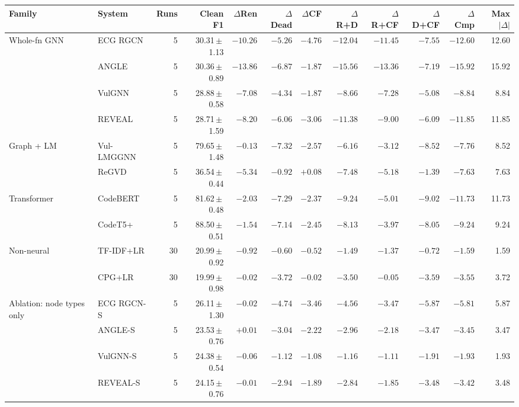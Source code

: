 \begin{tabular}{llrrrrrrrrrr}
\toprule
Family & System & Runs & Clean F1 & $\Delta$Ren & $\Delta$Dead & $\Delta$CF & $\Delta$R+D & $\Delta$R+CF & $\Delta$D+CF & $\Delta$Cmp & Max$|\Delta|$ \\
\midrule
Whole-fn GNN & ECG RGCN & 5 & 30.31\,$\pm$\,1.13 & $\mathbf{-10.26}$ & $\mathbf{-5.26}$ & $\mathbf{-4.76}$ & $\mathbf{-12.04}$ & $\mathbf{-11.45}$ & $\mathbf{-7.55}$ & $\mathbf{-12.60}$ & 12.60 \\
 & ANGLE & 5 & 30.36\,$\pm$\,0.89 & $\mathbf{-13.86}$ & $\mathbf{-6.87}$ & $\mathbf{-1.87}$ & $\mathbf{-15.56}$ & $\mathbf{-13.36}$ & $\mathbf{-7.19}$ & $\mathbf{-15.92}$ & 15.92 \\
 & VulGNN & 5 & 28.88\,$\pm$\,0.58 & $\mathbf{-7.08}$ & $\mathbf{-4.34}$ & $\mathbf{-1.87}$ & $\mathbf{-8.66}$ & $\mathbf{-7.28}$ & $\mathbf{-5.08}$ & $\mathbf{-8.84}$ & 8.84 \\
 & REVEAL & 5 & 28.71\,$\pm$\,1.59 & $\mathbf{-8.20}$ & $\mathbf{-6.06}$ & $\mathbf{-3.06}$ & $\mathbf{-11.38}$ & $\mathbf{-9.00}$ & $\mathbf{-6.09}$ & $\mathbf{-11.85}$ & 11.85 \\
\midrule
Graph + LM & Vul-LMGGNN & 5 & 79.65\,$\pm$\,1.48 & $-0.13$ & $\mathbf{-7.32}$ & $\mathbf{-2.57}$ & $\mathbf{-6.16}$ & $\mathbf{-3.12}$ & $\mathbf{-8.52}$ & $\mathbf{-7.76}$ & 8.52 \\
 & ReGVD & 5 & 36.54\,$\pm$\,0.44 & $\mathbf{-5.34}$ & $-0.92$ & $+0.08$ & $\mathbf{-7.48}$ & $\mathbf{-5.18}$ & $-1.39$ & $\mathbf{-7.63}$ & 7.63 \\
\midrule
Transformer & CodeBERT & 5 & 81.62\,$\pm$\,0.48 & $\mathbf{-2.03}$ & $\mathbf{-7.29}$ & $\mathbf{-2.37}$ & $\mathbf{-9.24}$ & $\mathbf{-5.01}$ & $\mathbf{-9.02}$ & $\mathbf{-11.73}$ & 11.73 \\
 & CodeT5+ & 5 & 88.50\,$\pm$\,0.51 & $\mathbf{-1.54}$ & $\mathbf{-7.14}$ & $\mathbf{-2.45}$ & $\mathbf{-8.13}$ & $\mathbf{-3.97}$ & $\mathbf{-8.05}$ & $\mathbf{-9.24}$ & 9.24 \\
\midrule
Non-neural & TF-IDF+LR & 30 & 20.99\,$\pm$\,0.92 & $-0.92$ & $-0.60$ & $-0.52$ & $-1.49$ & $-1.37$ & $-0.72$ & $-1.59$ & 1.59 \\
 & CPG+LR & 30 & 19.99\,$\pm$\,0.98 & $-0.02$ & $-3.72$ & $-0.02$ & $\mathbf{-3.50}$ & $-0.05$ & $-3.59$ & $-3.55$ & 3.72 \\
\midrule
Ablation: node types only & ECG RGCN-S & 5 & 26.11\,$\pm$\,1.30 & $-0.02$ & $\mathbf{-4.74}$ & $\mathbf{-3.46}$ & $\mathbf{-4.56}$ & $\mathbf{-3.47}$ & $\mathbf{-5.87}$ & $\mathbf{-5.81}$ & 5.87 \\
 & ANGLE-S & 5 & 23.53\,$\pm$\,0.76 & $+0.01$ & $-3.04$ & $\mathbf{-2.22}$ & $-2.96$ & $\mathbf{-2.18}$ & $-3.47$ & $-3.45$ & 3.47 \\
 & VulGNN-S & 5 & 24.38\,$\pm$\,0.54 & $\mathbf{-0.06}$ & $-1.12$ & $-1.08$ & $-1.16$ & $-1.11$ & $-1.91$ & $-1.93$ & 1.93 \\
 & REVEAL-S & 5 & 24.15\,$\pm$\,0.76 & $-0.01$ & $\mathbf{-2.94}$ & $\mathbf{-1.89}$ & $\mathbf{-2.84}$ & $\mathbf{-1.85}$ & $\mathbf{-3.48}$ & $\mathbf{-3.42}$ & 3.48 \\
\bottomrule
\end{tabular}
